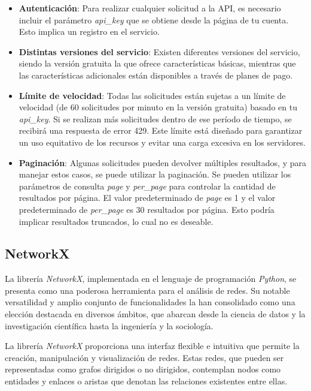 \begin{itemize}
    \item \textbf{Autenticación}: Para realizar cualquier solicitud a la API, es necesario
          incluir el parámetro \textit{api\_key} que se obtiene desde la página de tu cuenta.
          Esto implica un registro en el servicio.
    \item \textbf{Distintas versiones del servicio}: Existen diferentes versiones del servicio,
          siendo la versión gratuita la que ofrece características básicas, mientras que las características
          adicionales están disponibles a través de planes de pago.
    \item \textbf{Límite de velocidad}: Todas las solicitudes están sujetas a un límite de
          velocidad (de 60 solicitudes por minuto en la versión gratuita) basado en tu \textit{api\_key}.
          Si se realizan más solicitudes dentro de ese período de tiempo, se recibirá una respuesta de error 429. 
          Este límite está diseñado para garantizar un uso equitativo de los recursos y evitar una carga 
          excesiva en los servidores.
    \item \textbf{Paginación}: Algunas solicitudes pueden devolver múltiples resultados, y para
          manejar estos casos, se puede utilizar la paginación. Se pueden utilizar los parámetros de
          consulta \textit{page} y \textit{per\_page} para controlar la cantidad de resultados
          por página. El valor predeterminado de \textit{page} es 1 y el valor predeterminado
          de \textit{per\_page} es 30 resultados por página. Esto podría implicar resultados truncados,
          lo cual no es deseable.
\end{itemize}

\subsection{NetworkX}

La librería \emph{NetworkX}, implementada en el lenguaje de programación \emph{Python}, se presenta 
como una poderosa herramienta para el análisis de redes. Su notable versatilidad y amplio conjunto de
 funcionalidades la han consolidado como una elección destacada en diversos ámbitos, que abarcan desde
  la ciencia de datos y la investigación científica hasta la ingeniería y la sociología.

La librería \emph{NetworkX} proporciona una interfaz flexible e intuitiva que permite la creación, 
manipulación y visualización de redes. Estas redes, que pueden ser representadas como grafos dirigidos 
o no dirigidos, contemplan nodos como entidades y enlaces o aristas que denotan las relaciones 
existentes entre ellas.

